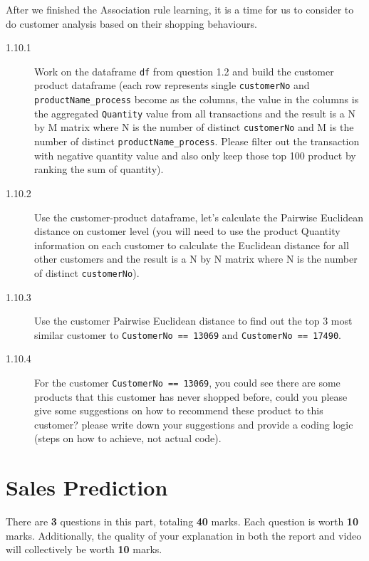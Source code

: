 \documentclass[a4paper]{article}
\begin{document}
    \begin{answer}[Question 1.10]
     After we finished the Association rule learning, it is a time for us to consider to do customer analysis based on their shopping behaviours.

     \begin{description}
         \item[1.10.1]  Work on the dataframe \texttt{df} from question 1.2 and build the customer product dataframe (each row represents single \texttt{customerNo} and \texttt{productName_process} become as the columns, the value in the columns is the aggregated \texttt{Quantity} value from all transactions and the result is a N by M matrix where N is the number of distinct \texttt{customerNo} and M is the number of distinct \texttt{productName_process}. Please filter out the transaction with negative quantity value and also only keep those top 100 product by ranking the sum of quantity).
         
         \item[1.10.2] Use the customer-product dataframe, let's calculate the Pairwise Euclidean distance on customer level (you will need to use the product Quantity information on each customer to calculate the Euclidean distance for all other customers and the result is a N by N matrix where N is the number of distinct \texttt{customerNo}). 

         \item[1.10.3]  Use the customer Pairwise Euclidean distance to find out the top 3 most similar customer to \texttt{CustomerNo == 13069} and \texttt{CustomerNo == 17490}. 

         \item[1.10.4]  For the customer \texttt{CustomerNo == 13069}, you could see there are some products that this customer has never shopped before, could you please give some suggestions on how to recommend these product to this customer? please write down your suggestions and provide a coding logic (steps on how to achieve, not actual code).
     \end{description}
    \end{answer}
    
    \part{Sales Prediction}\label{sec:part2}

    There are \textbf{3} questions in this part,
    totaling \textbf{40} marks.
    Each question is worth \textbf{10} marks. 
    Additionally,
    the quality of your explanation in both the report and video will collectively be worth \textbf{10} marks. 
    
\end{document}
